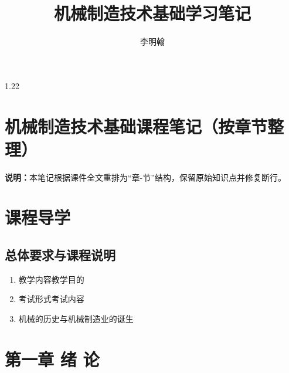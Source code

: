 \documentclass[12pt,a4paper]{article}
\title{机械制造技术基础学习笔记}
\author{李明翰}
\begin{document}
\maketitle
\newpage
\tableofcontents
\newpage

\begin{spacing}{1.22}
\RaggedRight
\section{机械制造技术基础课程笔记（按章节整理）}
\noindent\textbf{说明：}本笔记根据课件全文重排为“章-节”结构，保留原始知识点并修复断行。

\section{课程导学}
\subsection{总体要求与课程说明}
\begin{tcolorbox}[colback=yellow!6,colframe=red!55!black,title=重点,left=1mm,right=1mm]
\begin{enumerate}[leftmargin=2.2em,label=\arabic*.]
  \item 教学内容教学目的
  \item 考试形式考试内容
  \item 机械的历史与机械制造业的诞生
\end{enumerate}
\end{tcolorbox}

\section{第一章 绪 论}

\end{spacing}
\end{document}
